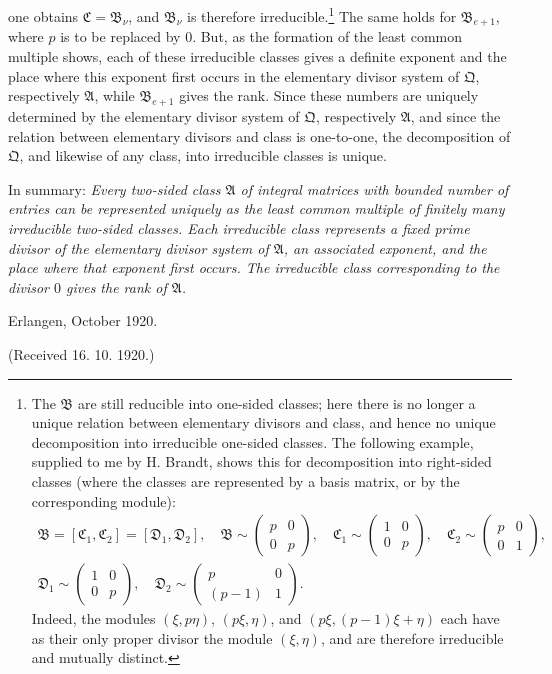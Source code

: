 \documentclass[11pt]{article}
\begin{document}
one obtains $\mathfrak C=\mathfrak B_\nu$, and $\mathfrak B_\nu$ is therefore irreducible.\footnote{The $\mathfrak B$ are still reducible into one-sided classes; here there is no longer a unique relation between elementary divisors and class, and hence no unique decomposition into irreducible one-sided classes. The following example, supplied to me by H. Brandt, shows this for decomposition into right-sided classes (where the classes are represented by a basis matrix, or by the corresponding module):
\[
\begin{gathered}
 \mathfrak B=[\mathfrak C_1,\mathfrak C_2]=[\mathfrak D_1,\mathfrak D_2],\quad
 \mathfrak B\sim\begin{pmatrix}p&0\\0&p\end{pmatrix},\quad
 \mathfrak C_1\sim\begin{pmatrix}1&0\\0&p\end{pmatrix},\quad
 \mathfrak C_2\sim\begin{pmatrix}p&0\\0&1\end{pmatrix},\\
 \mathfrak D_1\sim\begin{pmatrix}1&0\\0&p\end{pmatrix},
 \quad
 \mathfrak D_2\sim\begin{pmatrix}p&0\\(p-1)&1\end{pmatrix}.
\end{gathered}
\]
Indeed, the modules $(\xi,p\eta)$, $(p\xi,\eta)$, and $(p\xi,(p-1)\xi+\eta)$ each have as their only proper divisor the module $(\xi,\eta)$, and are therefore irreducible and mutually distinct.} The same holds for $\mathfrak B_{e+1}$, where $p$ is to be replaced by $0$. But, as the formation of the least common multiple shows, each of these irreducible classes gives a definite exponent and the place where this exponent first occurs in the elementary divisor system of $\mathfrak Q$, respectively $\mathfrak A$, while $\mathfrak B_{e+1}$ gives the rank. Since these numbers are uniquely determined by the elementary divisor system of $\mathfrak Q$, respectively $\mathfrak A$, and since the relation between elementary divisors and class is one-to-one, the decomposition of $\mathfrak Q$, and likewise of any class, into irreducible classes is unique.

In summary: \emph{Every two-sided class $\mathfrak A$ of integral matrices with bounded number of entries can be represented uniquely as the least common multiple of finitely many irreducible two-sided classes. Each irreducible class represents a fixed prime divisor of the elementary divisor system of $\mathfrak A$, an associated exponent, and the place where that exponent first occurs. The irreducible class corresponding to the divisor $0$ gives the rank of $\mathfrak A$.}

\begin{flushleft}
Erlangen, October 1920.
\end{flushleft}
\begin{center}
(Received 16. 10. 1920.)
\end{center}
\end{document}
